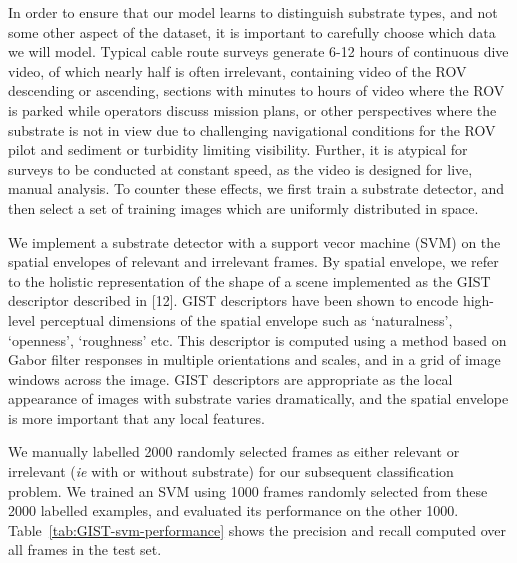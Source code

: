 In order to ensure that our model learns to distinguish substrate types, and not some other aspect of the dataset, it is important to carefully choose which data we will model. Typical cable route surveys generate 6-12 hours of continuous dive video, of which nearly half is often irrelevant, containing video of the ROV descending or ascending, sections with minutes to hours of video where the ROV is parked while operators discuss mission plans, or other perspectives where the substrate is not in view due to challenging navigational conditions for the ROV pilot and sediment or turbidity limiting visibility. Further, it is atypical for surveys to be conducted at constant speed, as the video is designed for live, manual analysis. To counter these effects, we first train a substrate detector, and then select a set of training images which are uniformly distributed in space.

We implement a substrate detector with a support vecor machine (SVM) on the spatial envelopes of relevant and irrelevant frames.
By spatial envelope, we refer to the holistic representation of the shape of a scene implemented as the GIST
descriptor described in [12]. GIST descriptors have been shown to encode high-level perceptual dimensions of the
spatial envelope such as ‘naturalness’, ‘openness’, ‘roughness’ etc. This descriptor is computed using a method based on Gabor filter responses in multiple orientations and scales, and in a grid of image windows across the image. GIST descriptors are appropriate as the local appearance of images with substrate varies dramatically, and the spatial envelope is more important that any local features.

We manually labelled 2000 randomly selected frames as either relevant or irrelevant (\emph{ie} with or without substrate) for our subsequent classification problem. We trained an SVM using 1000 frames randomly selected from these 2000 labelled examples, and evaluated its performance on the other 1000. Table~\ref{tab:GIST-svm-performance} shows the precision and recall computed over all frames in the test set.

